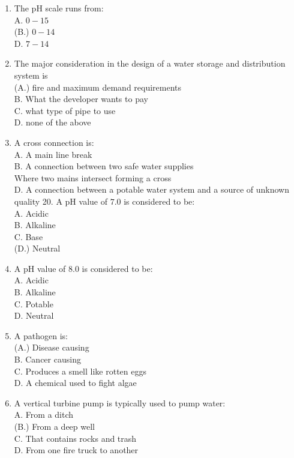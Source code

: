 \documentclass[10pt]{article}
\begin{document}
\begin{enumerate}
  \item The $\mathrm{pH}$ scale runs from:\\
A. $0-15$\\
(B.) $0-14$\\
D. $7-14$

  \item The major consideration in the design of a water storage and distribution system is\\
(A.) fire and maximum demand requirements\\
B. What the developer wants to pay\\
C. what type of pipe to use\\
D. none of the above

  \item A cross connection is:\\
A. A main line break\\
B. A connection between two safe water supplies\\
Where two mains intersect forming a cross\\
D. A connection between a potable water system and a source of unknown quality 20. A pH value of $7.0$ is considered to be:\\
A. Acidic\\
B. Alkaline\\
C. Base\\
(D.) Neutral

  \item A pH value of $8.0$ is considered to be:\\
A. Acidic\\
B. Alkaline\\
C. Potable\\
D. Neutral

  \item A pathogen is:\\
(A.) Disease causing\\
B. Cancer causing\\
C. Produces a smell like rotten eggs\\
D. A chemical used to fight algae

  \item A vertical turbine pump is typically used to pump water:\\
A. From a ditch\\
(B.) From a deep well\\
C. That contains rocks and trash\\
D. From one fire truck to another


\end{enumerate}
\end{document}
